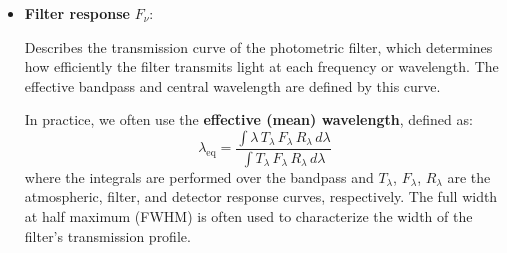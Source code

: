 \begin{itemize}
    \vspace{0.5em}

    Atmospheric extinction consists of both absorption and scattering by molecules and aerosols. 
    It increases with airmass and is typically parameterized using a linear relation in magnitudes:
    $$
        m(z) = m_0 + k a
    $$
    where $m(z)$ is the observed magnitude at zenith angle $z$, $m_0$ is the magnitude outside the atmosphere (zero airmass), $k$ is the extinction coefficient (which depends on wavelength and atmospheric conditions), and $a$ is the airmass, given by $a = 1/\cos(z)$. Alternatively, the airmass can also be expressed as $a = \alpha x$ for more precise geometric corrections, with $\alpha$ a proportionality constant and $x$ a path-length factor.

    \medskip

    An important process in atmospheric extinction is \textbf{Rayleigh scattering}: the scattering of light by small molecules. Rayleigh scattering is much stronger at shorter wavelengths (blue light), making the sky blue and causing stronger extinction for bluer astronomical sources.

    \medskip

    \item \textbf{Filter response} $F_\nu$: 
    
    Describes the transmission curve of the photometric filter, which determines how efficiently the filter transmits light at each frequency or wavelength. The effective bandpass and central wavelength are defined by this curve. 
    
    \vspace{0.5em}
    \begin{minipage}{0.62\textwidth}
    In practice, we often use the \textbf{effective (mean) wavelength}, defined as:
    $$
        \lambda_\mathrm{eq} = \frac{\int \lambda\,T_\lambda\,F_\lambda\,R_\lambda\, d\lambda}{\int T_\lambda\,F_\lambda\,R_\lambda\, d\lambda}
    $$
    where the integrals are performed over the bandpass and $T_\lambda$, $F_\lambda$, $R_\lambda$ are the atmospheric, filter, and detector response curves, respectively. The full width at half maximum (FWHM) is often used to characterize the width of the filter's transmission profile.
    \end{minipage}%
    \hfill
    \begin{minipage}{0.3\textwidth}
        \vspace{-2em}
        \begin{figure}[H]
            \centering
\end{figure}
\end{minipage}
\end{itemize}
